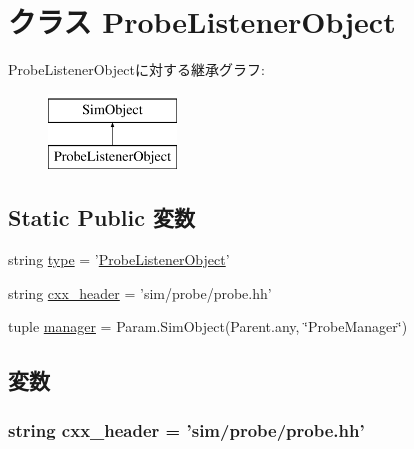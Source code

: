 \hypertarget{classProbe_1_1ProbeListenerObject}{
\section{クラス ProbeListenerObject}
\label{classProbe_1_1ProbeListenerObject}
}
ProbeListenerObjectに対する継承グラフ:\begin{figure}[H]
\begin{center}
\leavevmode
\includegraphics[height=2cm]{classProbe_1_1ProbeListenerObject}
\end{center}
\end{figure}
\subsection*{Static Public 変数}
\begin{DoxyCompactItemize}
\item 
string \hyperlink{classProbe_1_1ProbeListenerObject_acce15679d830831b0bbe8ebc2a60b2ca}{type} = '\hyperlink{classProbe_1_1ProbeListenerObject}{ProbeListenerObject}'
\item 
string \hyperlink{classProbe_1_1ProbeListenerObject_a17da7064bc5c518791f0c891eff05fda}{cxx\_\-header} = 'sim/probe/probe.hh'
\item 
tuple \hyperlink{classProbe_1_1ProbeListenerObject_af0880e1c5eebd0a677fcda1f43d4859b}{manager} = Param.SimObject(Parent.any, \char`\"{}ProbeManager\char`\"{})
\end{DoxyCompactItemize}


\subsection{変数}
\hypertarget{classProbe_1_1ProbeListenerObject_a17da7064bc5c518791f0c891eff05fda}{
\subsubsection[{cxx\_\-header}]{\setlength{\rightskip}{0pt plus 5cm}string {\bf cxx\_\-header} = 'sim/probe/probe.hh'}}
\label{classProbe_1_1ProbeListenerObject_a17da7064bc5c518791f0c891eff05fda}


